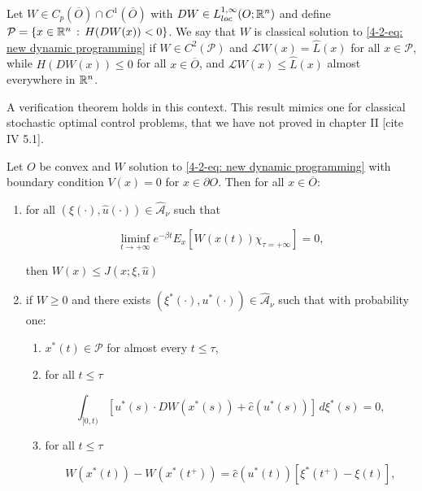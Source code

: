 \begin{definition}
    Let $W\in C_p(\overline{O})\cap C^1(\overline{O})$ with $DW\in L_{loc}^{1,\infty}(O;\mathbb{R}^n)$ and define $\mathcal{P}=\left\{x\in\mathbb{R}^n\,:\,H(DW(x))<0\right\}$. We say that $W$ is classical solution to \eqref{4-2-eq: new dynamic programming} if $W\in C^2(\mathcal{P})$ and $\mathcal{L}W(x)=\hat{L}(x)$ for all $x\in\mathcal{P}$, while $H(DW(x))\leq 0$ for all $x\in\overline{O}$, and $\mathcal{L}W(x)\leq \hat{L}(x)$ almost everywhere in $\mathbb{R}^n$.  
\end{definition}


A verification theorem holds in this context. This result mimics one for classical stochastic optimal control problems, that we have not proved in chapter II [cite IV 5.1].

\begin{theorem}
    Let $O$ be convex and $W$ solution to \eqref{4-2-eq: new dynamic programming} with boundary condition $V(x)=0$ for $x\in\partial O$. Then for all $x\in\overline{O}$:
    
    \begin{enumerate}[label=(\arabic*.)]
        \item for all $(\xi(\cdot),\hat{u}(\cdot))\in\hat{\mathcal{A}}_{\nu}$ such that
        
        \begin{equation}
            \liminf_{t\to+\infty} e^{-\beta t}E_x\left[W(x(t))\chi_{\tau=+\infty}\right] = 0,
        \end{equation}

        then $W(x)\leq J(x;\xi,\hat{u})$

        \item if $W\geq 0$ and there exists $(\xi^{\ast}(\cdot),u^{\ast}(\cdot))\in\hat{\mathcal{A}}_{\nu}$ such that with probability one:
        
        \begin{enumerate}[label=(2.\alph*.)]
            \item $x^{\ast}(t)\in\mathcal{P}$ for almost every $t\leq \tau$,
            \item for all $t\leq\tau$
            
            \[\int_{[0,t)} \left[u^{\ast}(s)\cdot DW(x^{\ast}(s)) + \hat{c}(u^{\ast}(s))\right]\,d\xi^{\ast}(s) = 0,\]

            \item for all $t\leq \tau$
            
            \[W(x^{\ast}(t)) - W(x^{\ast}(t^+)) = \hat{c}(u^{\ast}(t))\left[\xi^{\ast}(t^+) - \xi(t)\right],\]
            

\end{enumerate}
\end{enumerate}
\end{theorem}
